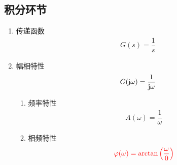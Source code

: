 \subsection{积分环节}
\begin{enumerate}[1.]
	\item 传递函数
	\vspace*{-0.5em}
	\begin{align}
		G(s) = \dfrac{1}{s}
	\end{align}
	\vspace*{-3em}
	
	\item 幅相特性
	\vspace*{-0.5em}
	\begin{align}
		G(\text{j}  \omega) = \dfrac{1}{\text{j} \omega}
	\end{align}
	\vspace*{-3em}
	\begin{enumerate}[(1) ]
		\item 频率特性
		\vspace*{-0.5em}
		\begin{align}
			A(\omega) = \dfrac{1}{\omega}
		\end{align}
		\vspace*{-3em}
		
		\item 相频特性
		\vspace*{-0.5em}
		\begin{align}
			\textcolor{red}{\varphi(\omega) =  \arctan \left(\dfrac{\omega}{0}\right)}
		\end{align}
		\vspace*{-3em}
		

\end{enumerate}
\end{enumerate}
